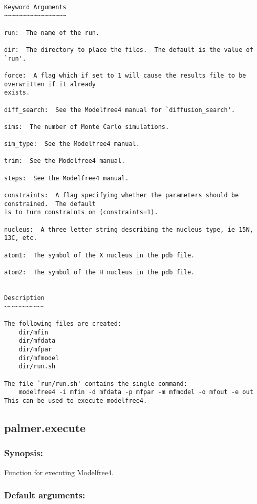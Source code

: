 {\scriptsize
\begin{verbatim}

Keyword Arguments
~~~~~~~~~~~~~~~~~

run:  The name of the run.

dir:  The directory to place the files.  The default is the value of `run'.

force:  A flag which if set to 1 will cause the results file to be overwritten if it already
exists.

diff_search:  See the Modelfree4 manual for `diffusion_search'.

sims:  The number of Monte Carlo simulations.

sim_type:  See the Modelfree4 manual.

trim:  See the Modelfree4 manual.

steps:  See the Modelfree4 manual.

constraints:  A flag specifying whether the parameters should be constrained.  The default
is to turn constraints on (constraints=1).

nucleus:  A three letter string describing the nucleus type, ie 15N, 13C, etc.

atom1:  The symbol of the X nucleus in the pdb file.

atom2:  The symbol of the H nucleus in the pdb file.


Description
~~~~~~~~~~~

The following files are created:
    dir/mfin
    dir/mfdata
    dir/mfpar
    dir/mfmodel
    dir/run.sh

The file `run/run.sh' contains the single command:
    modelfree4 -i mfin -d mfdata -p mfpar -m mfmodel -o mfout -e out
This can be used to execute modelfree4.
\end{verbatim}
}



\newpage

\subsection{palmer.execute}


\subsubsection{Synopsis:}

Function for executing Modelfree4.

\subsubsection{Default arguments:}

